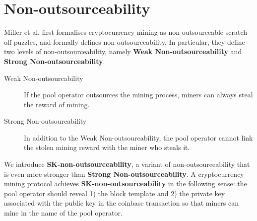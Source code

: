 \section{Non-outsourceability}



Miller et al. \cite{miller2015nonoutsourceable} first formalises cryptocurrency mining as non-outsourceable scratch-off puzzles, and formally defines non-outsourceability.
In particular, they define two levels of non-outsourceability, namely \textbf{Weak Non-outsourceability} and \textbf{Strong Non-outsourceability}.

\begin{description}
    \item[Weak Non-outsourcability] If the pool operator outsources the mining process, miners can always steal the reward of mining.
    \item[Strong Non-outsourcability] In addition to the Weak Non-outsourcability, the pool operator cannot link the stolen mining reward with the miner who steals it.
\end{description}

We introduce \textbf{SK-non-outsourceability}, a variant of non-outsourceability that is even more stronger than \textbf{Strong Non-outsourceability}. 
A cryptocurrency mining protocol achieves \textbf{SK-non-outsourceability} in the following sense: the pool operator should reveal 1) the block template and 2) the private key associated with the public key in the coinbase transaction so that miners can mine in the name of the pool operator.

